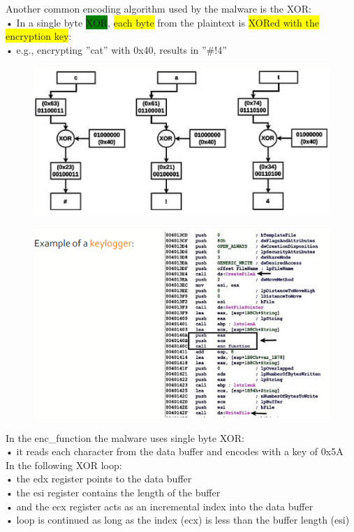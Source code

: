 \documentclass[]{project_plan}
\begin{document}
Another common encoding algorithm used by the malware is the XOR:\\
• In a single byte \colorbox{green}{XOR}, \colorbox{yellow}{each byte} from the plaintext is \colorbox{yellow}{XORed with the encryption key}:\\
• e.g., encrypting ”cat” with 0x40, results in ”\#!4”


\begin{figure}
  \centering
  \includegraphics[width=.8\linewidth]{xor obfuscation.png}
\end{figure}
\begin{figure}
  \centering
  \includegraphics[width=.8\linewidth]{keylogger obfuscation example.png}
\end{figure}

In the enc\_function the malware uses single byte XOR:\\
• it reads each character from the data buffer and encodes with a key of 0x5A\\
In the following XOR loop:\\
• the edx register points to the data buffer\\
• the esi register contains the length of the buffer\\
• and the ecx register acts as an incremental index into the data buffer\\
• loop is continued as long as the index (ecx) is less than the buffer length (esi)
\end{document}
